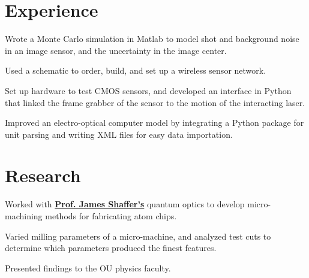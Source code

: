 \documentclass[letterpaper]{deedy-resume} %
\begin{document}
\begin{minipage}[t]{0.66\textwidth} %




\section{Experience}

\vspace{\topsep} %
\begin{tightitemize}
 \item Wrote a Monte Carlo simulation in Matlab to model shot and background noise in an image sensor, and the uncertainty in the image center.
      \item Used a schematic to order, build, and set up a wireless sensor network.
      \item Set up hardware to test CMOS sensors, and developed an interface in Python that linked the frame grabber of the sensor to the motion of the interacting laser.
      \item Improved an electro-optical computer model by integrating a Python package for unit parsing and writing XML files for easy data importation.
\end{tightitemize}

\sectionspace %




\section{Research}

\begin{tightitemize}
\item Worked with \textbf{\href{https://www.nhn.ou.edu/~shaffer/research/}{Prof. James Shaffer's}} quantum optics to develop micro-machining methods for fabricating atom chips. 
\item Varied milling parameters of a micro-machine, and analyzed test cuts to determine which parameters produced the finest features. 
\item Presented findings to the OU physics faculty.
\end{tightitemize}


\end{minipage}
\end{document}
